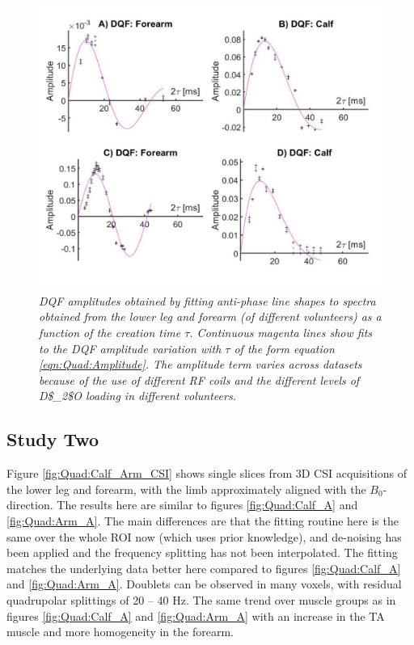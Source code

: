 \begin{figure}
    \centering
    \includegraphics[width=1\textwidth]{Figures/Quad/BuildUp.png}
    \caption{\textit{\ac{DQF} amplitudes obtained by fitting anti-phase line shapes to spectra obtained from the lower leg and forearm (of different volunteers) as a function of the creation time $\tau$. Continuous magenta lines show fits to the \ac{DQF} amplitude variation with $\tau$ of the form equation \ref{eqn:Quad:Amplitude}. The amplitude term varies across datasets because of the use of different RF coils and the different levels of \ac{D$_2$O} loading in different volunteers.}}
    \label{fig:Quad:BuildUp}
\end{figure}

\subsection{Study Two}

Figure \ref{fig:Quad:Calf_Arm_CSI} shows single slices from 3D \ac{CSI} acquisitions of the lower leg and forearm, with the limb approximately aligned with the $B_0$-direction. The results here are similar to figures \ref{fig:Quad:Calf_A} and \ref{fig:Quad:Arm_A}. The main differences are that the fitting routine here is the same over the whole \ac{ROI} now (which uses prior knowledge), and de-noising has been applied and the frequency splitting has not been interpolated. The fitting matches the underlying data better here compared to figures \ref{fig:Quad:Calf_A} and \ref{fig:Quad:Arm_A}. Doublets can be observed in many voxels, with residual quadrupolar splittings of 20 – 40 Hz. The same trend over muscle groups as in figures \ref{fig:Quad:Calf_A} and \ref{fig:Quad:Arm_A} with an increase in the TA muscle and more homogeneity in the forearm.

